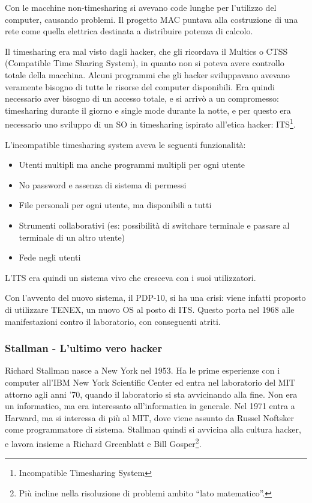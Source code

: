 Con le macchine non-timesharing si avevano code lunghe per l'utilizzo del computer, causando problemi. Il progetto MAC puntava alla costruzione di una rete come quella elettrica destinata a distribuire potenza di calcolo.

Il timesharing era mal visto dagli hacker, che gli ricordava il Multics o CTSS (Compatible Time Sharing System), in quanto non si poteva avere controllo totale della macchina. Alcuni programmi che gli hacker sviluppavano avevano veramente bisogno di tutte le risorse del computer disponibili. Era quindi necessario aver bisogno di un accesso totale, e si arriv\`o a un compromesso: timesharing durante il giorno e single mode durante la notte, e per questo era necessario uno sviluppo di un SO in timesharing ispirato all'etica hacker: ITS\footnote{Incompatible Timesharing System}.

L'incompatible timesharing system aveva le seguenti funzionalit\`a:
\begin{itemize}

\item Utenti multipli ma anche programmi multipli per ogni utente
\item No password e assenza di sistema di permessi
\item File personali per ogni utente, ma disponibili a tutti
\item Strumenti collaborativi (es: possibilit\`a di switchare terminale e passare al terminale di un altro utente)
\item Fede negli utenti

\end{itemize}

L'ITS era quindi un sistema vivo che cresceva  con i suoi utilizzatori.

Con l'avvento del nuovo sistema, il PDP-10, si ha una crisi: viene infatti proposto di utilizzare TENEX, un nuovo OS al posto di ITS. Questo porta nel 1968 alle manifestazioni contro il laboratorio, con conseguenti atriti.

\subsubsection{Stallman - L'ultimo vero hacker}

Richard Stallman nasce a New York nel 1953. Ha le prime esperienze con i computer all'IBM New York Scientific Center ed entra nel laboratorio del MIT attorno agli anni '70, quando il laboratorio si sta avvicinando alla fine. Non era un informatico, ma era interessato all'informatica in generale. Nel 1971 entra a Harward, ma si interessa di pi\`u al MIT, dove viene assunto da Russel Noftsker come programmatore di sistema. Stallman quindi si avvicina alla cultura hacker, e lavora insieme a Richard Greenblatt e Bill Gosper\footnote{Pi\`u incline nella risoluzione di problemi ambito ``lato matematico''.}.

